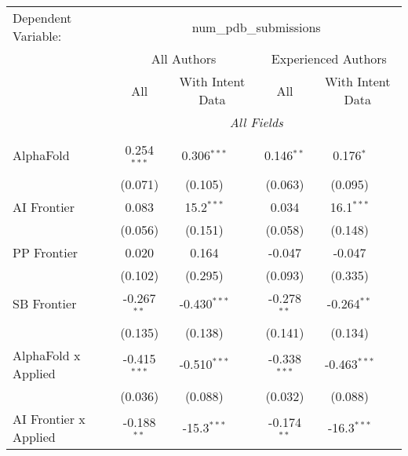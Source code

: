\begingroup
\centering
\begin{tabular}{lcccccc}
   \tabularnewline \midrule \midrule
   Dependent Variable: & \multicolumn{6}{c}{num\_pdb\_submissions}\\
 & \multicolumn{3}{c}{All Authors} & \multicolumn{3}{c}{Experienced Authors} \\
\cmidrule(lr){2-4} \cmidrule(lr){5-7}
 & \multicolumn{1}{c}{All} & \multicolumn{2}{c}{With Intent Data} & \multicolumn{1}{c}{All} & \multicolumn{2}{c}{With Intent Data} \\
\cmidrule(lr){2-2} \cmidrule(lr){3-4} \cmidrule(lr){5-5} \cmidrule(lr){6-7}
 & \multicolumn{6}{c}{\textit{All Fields}} \\ \\
   AlphaFold                      & 0.254$^{***}$  & 0.306$^{***}$  &                & 0.146$^{**}$   & 0.176$^{*}$    &   \\   
                                  & (0.071)        & (0.105)        &                & (0.063)        & (0.095)        &   \\   
   AI Frontier                    & 0.083          & 15.2$^{***}$   &                & 0.034          & 16.1$^{***}$   &   \\   
                                  & (0.056)        & (0.151)        &                & (0.058)        & (0.148)        &   \\   
   PP Frontier                    & 0.020          & 0.164          &                & -0.047         & -0.047         &   \\   
                                  & (0.102)        & (0.295)        &                & (0.093)        & (0.335)        &   \\   
   SB Frontier                    & -0.267$^{**}$  & -0.430$^{***}$ &                & -0.278$^{**}$  & -0.264$^{**}$  &   \\   
                                  & (0.135)        & (0.138)        &                & (0.141)        & (0.134)        &   \\   
   AlphaFold x Applied            & -0.415$^{***}$ & -0.510$^{***}$ &                & -0.338$^{***}$ & -0.463$^{***}$ &   \\   
                                  & (0.036)        & (0.088)        &                & (0.032)        & (0.088)        &   \\   
   AI Frontier x Applied          & -0.188$^{**}$  & -15.3$^{***}$  &                & -0.174$^{**}$  & -16.3$^{***}$  &   \\   

\end{tabular}
